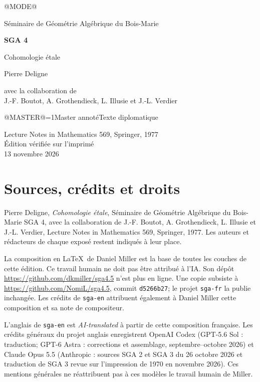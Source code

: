 \documentclass[oneside]{book}
\makeatletter
\theoremstyle{sga-source}
\theoremstyle{sga-source-dash}
\theoremstyle{sga-source-dotdash}
\theoremstyle{sga-source-number-note-dash}
\theoremstyle{sga-source-note-number-dotdash}
\theoremstyle{sga-source-example-dotdash}
\theoremstyle{sga-source-inline-number}
\theoremstyle{sga-source-bare-number}
\theoremstyle{sga-source}
\providecommand\EditionMode{@MODE@}
\providecommand\EditionIsMaster{@MASTER@}
\makeatother
\begin{document}
\hypersetup{pageanchor=false}
\ifcase\EditionMode

\begin{titlepage}
\centering
\vspace*{2cm}
{\Large Séminaire de Géométrie Algébrique du Bois-Marie\par}
\vspace{0.7cm}
{\Huge\bfseries SGA 4\textonehalf\par}
\vspace{0.8cm}
{\huge Cohomologie étale\par}
\vspace{1cm}
{\Large Pierre Deligne\par}
\vspace{0.5cm}
avec la collaboration de\\[0.3em]
J.-F. Boutot, A. Grothendieck, L. Illusie et J.-L. Verdier
\vfill
{\Large \ifnum\EditionIsMaster=1\relax Master annoté\else Texte diplomatique\fi\par}
\vspace{0.7cm}
Lecture Notes in Mathematics 569, Springer, 1977\\[0.4em]
Édition vérifiée sur l’imprimé\\
13 novembre 2026
\end{titlepage}

\chapter*{Sources, crédits et droits}
Pierre Deligne, \emph{Cohomologie étale}, Séminaire de Géométrie Algébrique
du Bois-Marie SGA 4\textonehalf, avec la collaboration de J.-F. Boutot,
A. Grothendieck, L. Illusie et J.-L. Verdier, Lecture Notes in Mathematics
569, Springer, 1977. Les auteurs et rédacteurs de chaque exposé restent
indiqués à leur place.

\medskip
La composition en \LaTeX\ de Daniel Miller est la base de toutes les couches
de cette édition. Ce travail humain ne doit pas être attribué à l’IA.
Son dépôt \url{https://github.com/dkmiller/sga4.5} n’est plus en ligne.
Une copie subsiste à \url{https://github.com/NomiL/sga4.5}, commit
\texttt{d5266b27}; le projet \texttt{sga-fr} la publie inchangée.
Les crédits de \texttt{sga-en} attribuent également à Daniel Miller cette
composition et sa note de compositeur.

\medskip
L’anglais de \texttt{sga-en} est \emph{AI-translated} à partir de cette
composition française. Les crédits généraux du projet anglais enregistrent
OpenAI Codex (GPT-5.6 Sol : traduction; GPT-6 Astra : corrections et
assemblage, septembre--octobre 2026) et Claude Opus 5.5 (Anthropic : sources
SGA 2 et SGA 3 du 26 octobre 2026 et traduction de SGA 3 revue sur
l’impression de 1970 en novembre 2026). Ces mentions générales ne
réattribuent pas à ces modèles le travail humain de Miller.
\end{document}
